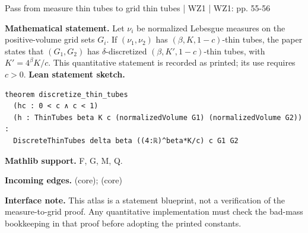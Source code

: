 \documentclass[10pt,a4paper]{article}
\newcommand{\nodecard}[1]{\hyperlink{node-#1}{\texttt{\detokenize{#1}}}}
\begin{document}
\begin{minipage}{\linewidth}
\hypertarget{node-L8_3}{}
\begin{tcolorbox}[colback=white,colframe=radialfg,colbacktitle=radialbg,coltitle=ink,boxrule=0.45pt,arc=1.6mm,left=3mm,right=3mm,top=2mm,bottom=2mm,title={\sffamily\bfseries WZ1 Lemma 8.3 \hfill \texttt{L8\_3}}]
{\sffamily\small\color{muted}Pass from measure thin tubes to grid thin tubes | WZ1 | WZ1: pp. 55-56}\par
\textbf{Mathematical statement.} Let $\nu_i$ be normalized Lebesgue measures on the positive-volume grid sets $G_i$.
If $(\nu_1,\nu_2)$ has $(\beta,K,1-c)$-thin tubes, the paper states that $(G_1,G_2)$ has $\delta$-discretized $(\beta,K',1-c)$-thin tubes, with $K'=4^\beta K/c$.
This quantitative statement is recorded as printed; its use requires $c>0$.
\smallskip\textbf{Lean statement sketch.}
\begin{Verbatim}[fontsize=\small,breaklines=true,breakanywhere=true,tabsize=2]
theorem discretize_thin_tubes
  (hc : 0 < c ∧ c < 1)
  (h : ThinTubes beta K c (normalizedVolume G1) (normalizedVolume G2)) :
  DiscreteThinTubes delta beta ((4:ℝ)^beta*K/c) c G1 G2
\end{Verbatim}
{\footnotesize\textbf{Mathlib support.} F, G, M, Q.\par
\textbf{Incoming edges.} \nodecard{Dthin} (core); \nodecard{DthinD} (core)\par}
{\footnotesize\textbf{Interface note.} This atlas is a statement blueprint, not a verification of the measure-to-grid proof. Any quantitative implementation must check the bad-mass bookkeeping in that proof before adopting the printed constants.}
\end{tcolorbox}\end{minipage}\par\medskip
\end{document}
